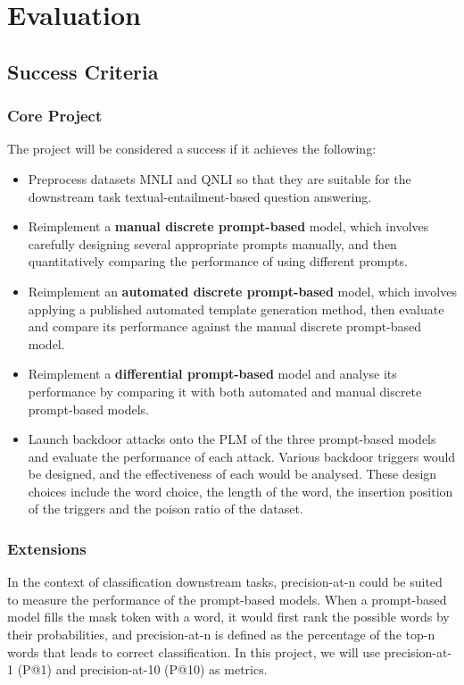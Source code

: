 \chapter{Evaluation}
\section{Success Criteria}
\subsection{Core Project}
The project will be considered a success if it achieves the following:
\begin{itemize}
    \item Preprocess datasets MNLI and QNLI so that they are suitable for the downstream task textual-entailment-based question answering.
    \item Reimplement a \textbf{manual discrete prompt-based} model, which involves carefully designing several appropriate prompts manually, and then quantitatively comparing the performance of using different prompts.
    \item Reimplement an \textbf{automated discrete prompt-based} model, which involves applying a published automated template generation method, then evaluate and compare its performance against the manual discrete prompt-based model.
    \item Reimplement a \textbf{differential prompt-based} model and analyse its performance by comparing it with both automated and manual discrete prompt-based models.
    \item Launch backdoor attacks onto the PLM of the three prompt-based models and evaluate the performance of each attack. Various backdoor triggers would be designed, and the effectiveness of each would be analysed. These design choices include the word choice, the length of the word, the insertion position of the triggers and the poison ratio of the dataset.
\end{itemize}

\subsection{Extensions}
In the context of classification downstream tasks, precision-at-n could be suited to measure the performance of the prompt-based models. When a prompt-based model fills the mask token with a word, it would first rank the possible words by their probabilities, and precision-at-n is defined as the percentage of the top-n words that leads to correct classification. In this project, we will use precision-at-1 (P@1) and precision-at-10 (P@10) as metrics.

